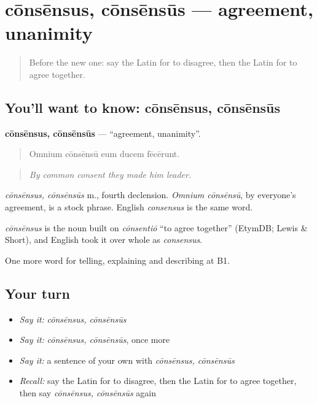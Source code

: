 \section[cōnsēnsus, cōnsēnsūs]{cōnsēnsus, cōnsēnsūs — agreement, unanimity}

\label{lesson:LA-C358-consensus}



\begin{quote}
Before the new one: say the Latin for to disagree, then the Latin for to agree together.
\end{quote}

\subsection*{You'll want to know: cōnsēnsus, cōnsēnsūs}
\textbf{cōnsēnsus, cōnsēnsūs} — \textquotedblleft{}agreement, unanimity\textquotedblright{}.

\begin{quote}
Omnium cōnsēnsū eum ducem fēcērunt.
\end{quote}

\begin{quote}
\emph{By common consent they made him leader.}
\end{quote}

\emph{cōnsēnsus, cōnsēnsūs} m., fourth declension. \emph{Omnium cōnsēnsū}, by everyone's agreement, is a stock phrase. English \emph{consensus} is the same word.

\begin{cousinweb}
\emph{cōnsēnsus} is the noun built on \emph{cōnsentiō} \textquotedblleft{}to agree together\textquotedblright{} (EtymDB; Lewis \& Short), and English took it over whole as \emph{consensus}.
\end{cousinweb}

\begin{grammarlens}[title={What you've built}]
One more word for telling, explaining and describing at B1.
\end{grammarlens}

\subsection*{Your turn}
\begin{itemize}
\raggedright
  \item \emph{Say it:} \emph{cōnsēnsus, cōnsēnsūs}
  \item \emph{Say it:} \emph{cōnsēnsus, cōnsēnsūs}, once more
  \item \emph{Say it:} a sentence of your own with \emph{cōnsēnsus, cōnsēnsūs}
  \item \emph{Recall:} say the Latin for to disagree, then the Latin for to agree together, then say \emph{cōnsēnsus, cōnsēnsūs} again
\end{itemize}

